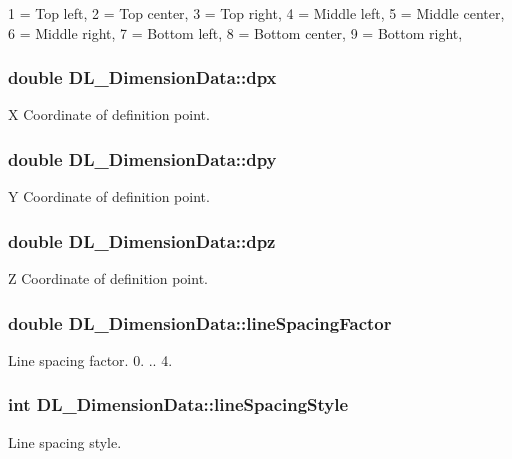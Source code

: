 1 = Top left, 2 = Top center, 3 = Top right, 4 = Middle left, 5 = Middle center, 6 = Middle right, 7 = Bottom left, 8 = Bottom center, 9 = Bottom right, \hypertarget{structDL__DimensionData_a08b464fb7d6d2cf3aeeb9784aeba43a5}{
\subsubsection[{dpx}]{\setlength{\rightskip}{0pt plus 5cm}double D\-L\-\_\-\-Dimension\-Data\-::dpx}}\label{structDL__DimensionData_a08b464fb7d6d2cf3aeeb9784aeba43a5}
X Coordinate of definition point. \hypertarget{structDL__DimensionData_a393e68ec30ec8f2ac112cb31e6a26fd7}{
\subsubsection[{dpy}]{\setlength{\rightskip}{0pt plus 5cm}double D\-L\-\_\-\-Dimension\-Data\-::dpy}}\label{structDL__DimensionData_a393e68ec30ec8f2ac112cb31e6a26fd7}
Y Coordinate of definition point. \hypertarget{structDL__DimensionData_a3e43631783886cdda86b70738c6bc9a2}{
\subsubsection[{dpz}]{\setlength{\rightskip}{0pt plus 5cm}double D\-L\-\_\-\-Dimension\-Data\-::dpz}}\label{structDL__DimensionData_a3e43631783886cdda86b70738c6bc9a2}
Z Coordinate of definition point. \hypertarget{structDL__DimensionData_a9f7b4efea9265483956b6e647a738d5d}{
\subsubsection[{line\-Spacing\-Factor}]{\setlength{\rightskip}{0pt plus 5cm}double D\-L\-\_\-\-Dimension\-Data\-::line\-Spacing\-Factor}}\label{structDL__DimensionData_a9f7b4efea9265483956b6e647a738d5d}
Line spacing factor. 0. .. 4. \hypertarget{structDL__DimensionData_aff9d21fe4772c475795b3c4bde00b711}{
\subsubsection[{line\-Spacing\-Style}]{\setlength{\rightskip}{0pt plus 5cm}int D\-L\-\_\-\-Dimension\-Data\-::line\-Spacing\-Style}}\label{structDL__DimensionData_aff9d21fe4772c475795b3c4bde00b711}
Line spacing style.

